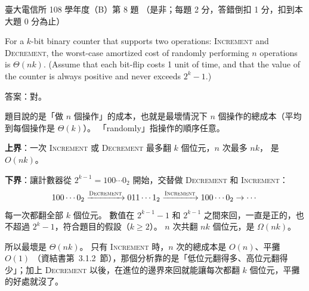 \begin{pastexam}[label={px:ntu-108-comm-dsab-08}]{臺大電信所 108 學年度（B）第 8 題}
（是非；每題 2 分，答錯倒扣 1 分，扣到本大題 0 分為止）

For a $k$-bit binary counter that supports two operations: \textsc{Increment} and
\textsc{Decrement}, the worst-case amortized cost of randomly performing $n$ operations is
$\Theta(nk)$. (Assume that each bit-flip costs 1 unit of time, and that the value of the counter
is always positive and never exceeds $2^k-1$.)
\end{pastexam}

\begin{pastsoln}
答案：對。

題目說的是「做 $n$ 個操作」的成本，也就是最壞情況下 $n$ 個操作的總成本（平均到每個操作是
$\Theta(k)$）。 「randomly」指操作的順序任意。

\textbf{上界}：一次 \textsc{Increment} 或 \textsc{Decrement} 最多翻 $k$ 個位元，$n$ 次最多 $nk$，
是 $O(nk)$。

\textbf{下界}：讓計數器從 $2^{k-1} = 100\cdots0_2$ 開始，交替做 \textsc{Decrement} 和
\textsc{Increment}：
\[
100\cdots0_2 \xrightarrow{\textsc{Decrement}} 011\cdots1_2 \xrightarrow{\textsc{Increment}}
100\cdots0_2 \to \cdots
\]
每一次都翻全部 $k$ 個位元。 數值在 $2^{k-1} - 1$ 和 $2^{k-1}$ 之間來回，一直是正的，也不超過
$2^k - 1$，符合題目的假設（$k \ge 2$）。 $n$ 次共翻 $nk$ 個位元，是 $\Omega(nk)$。

所以最壞是 $\Theta(nk)$。 只有 \textsc{Increment} 時，$n$ 次的總成本是 $O(n)$、平攤 $O(1)$
（資結書第~3.1.2~節），那個分析靠的是「低位元翻得多、高位元翻得少」；加上 \textsc{Decrement}
以後，在進位的邊界來回就能讓每次都翻 $k$ 個位元，平攤的好處就沒了。
\end{pastsoln}
